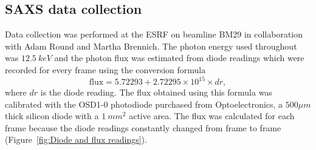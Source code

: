 \subsection{SAXS data collection}
\label{sub:SAXS data collection}
Data collection was performed at the ESRF on beamline BM29 in collaboration with Adam Round and Martha Brennich.
The photon energy used throughout was $12.5\ keV$ and the photon flux was estimated from diode readings which were recorded for every frame using the conversion formula
\begin{equation}
    \text{flux} = 5.72293 + 2.72295 \times 10^{15} \times dr,
\end{equation}
where $dr$ is the diode reading.
The flux obtained using this formula was calibrated with the OSD1-0 photodiode purchased from Optoelectronics, a $500 \mu m$ thick silicon diode with a $ 1\ mm^2 $ active area.
The flux was calculated for each frame because the diode readings constantly changed from frame to frame (Figure~\ref{fig:Diode and flux readings}).
